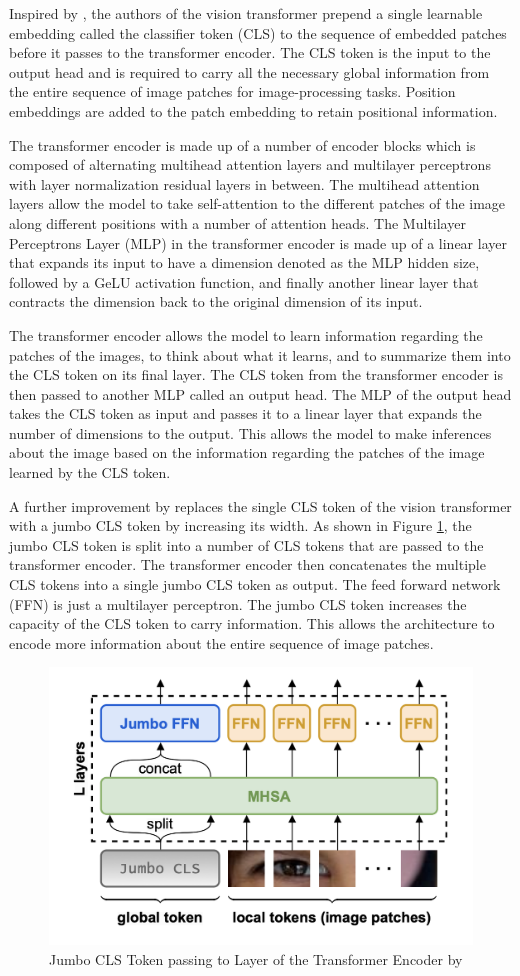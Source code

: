 Inspired by \cite{bert}, the authors of the vision transformer prepend a single learnable embedding called the classifier token (CLS) to the sequence of embedded patches before it passes to the transformer encoder. The CLS token is the input to the output head and is required to carry all the necessary global information from the entire sequence of image patches for image-processing tasks. Position embeddings are added to the patch embedding to retain positional information.

The transformer encoder is made up of a number of encoder blocks which is composed of alternating multihead attention layers and multilayer perceptrons with layer normalization residual layers in between. The multihead attention layers allow the model to take self-attention to the different patches of the image along different positions with a number of attention heads. The Multilayer Perceptrons Layer (MLP) in the transformer encoder is made up of a linear layer that expands its input to have a dimension denoted as the MLP hidden size, followed by a GeLU activation function, and finally another linear layer that contracts the dimension back to the original dimension of its input.

The transformer encoder allows the model to learn information regarding the patches of the images, to think about what it learns, and to summarize them into the CLS token on its final layer. The CLS token from the transformer encoder is then passed to another MLP called an output head. The MLP of the output head takes the CLS token as input and passes it to a linear layer that expands the number of dimensions to the output. This allows the model to make inferences about the image based on the information regarding the patches of the image learned by the CLS token.

A further improvement by \cite{fuller2025simpler} replaces the single CLS token of the vision transformer with a jumbo CLS token by increasing its width. As shown in Figure \ref{fig:jumbo-cls}, the jumbo CLS token is split into a number of CLS tokens that are passed to the transformer encoder. The transformer encoder then concatenates the multiple CLS tokens into a single jumbo CLS token as output. The feed forward network (FFN) is just a multilayer perceptron. The jumbo CLS token increases the capacity of the CLS token to carry information. This allows the architecture to encode more information about the entire sequence of image patches.

\begin{figure}[H]
    \centering
    \includegraphics[width=0.5\linewidth]{images/jumbo_cls.png}
    \caption{Jumbo CLS Token passing to Layer of the Transformer Encoder by \cite{fuller2025simpler}}
    \label{fig:jumbo-cls}
\end{figure}

